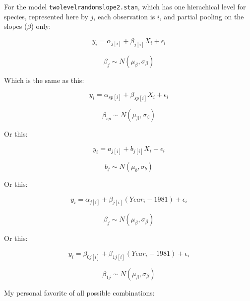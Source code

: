 \documentclass[12pt,a4paper]{article}
\begin{document}
\noindent For the model \verb|twolevelrandomslope2.stan|, which has one hierachical level for species, represented here by $j$, each observation is $i$, and partial pooling on the slopes ($\beta$) only:


\begin{equation}
y_{i}=\alpha_{j[i]}+\beta_{j[i]}X_{i}+\epsilon_{i}
\end{equation}

\begin{equation}
\beta_{j} \sim N(\mu_{\beta}, \sigma_{\beta})
\end{equation}

Which is the same as this:

\begin{equation}
y_{i}=\alpha_{sp[i]}+\beta_{sp[i]}X_{i}+\epsilon_{i}
\end{equation}

\begin{equation}
\beta_{sp} \sim N(\mu_{\beta}, \sigma_{\beta})
\end{equation}

Or this:

\begin{equation}
y_{i}=a_{j[i]}+b_{j[i]}X_{i}+\epsilon_{i}
\end{equation}

\begin{equation}
b_{j} \sim N(\mu_{b}, \sigma_{b})
\end{equation}

Or this:

\begin{equation}
y_{i}=\alpha_{j[i]}+\beta_{j[i]}(Year_{i}-1981)+\epsilon_{i}
\end{equation}

\begin{equation}
\beta_{j} \sim N(\mu_{\beta}, \sigma_{\beta})
\end{equation}

Or this:

\begin{equation}
y_{i}=\beta_{0j[i]}+\beta_{1j[i]}(Year_{i}-1981)+\epsilon_{i}
\end{equation}

\begin{equation}
\beta_{1j} \sim N(\mu_{\beta}, \sigma_{\beta})
\end{equation}

\vspace{3ex}
My personal favorite of all possible combinations:
\end{document}
